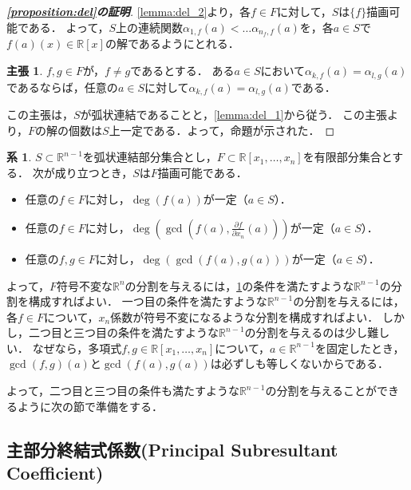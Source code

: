 \documentclass[uplatex, dvipdfmx]{jsarticle}
\newcommand{\R}{\mathbb{R}}
\theoremstyle{definition}
\newtheorem{corollary}{系}[section]
\newtheorem*{claim*}{主張}
\begin{document}
\begin{proof}[{\bf \cref{proposition:del}の証明}]
\cref{lemma:del_2}より，各$f \in F$に対して，$S$は$\{f\}$描画可能である．
よって，$S$上の連続関数$\alpha_{1,f}(a) < \dots \alpha_{n_f, f}(a)$を，各$a \in S$で$f(a)(x) \in \R[x]$の解であるようにとれる．

\begin{claim*}
$f, g \in F$が，$f \neq g$であるとする．
ある$a \in S$において$\alpha_{k,f}(a) = \alpha_{l,g}(a)$であるならば，任意の$a \in S$に対して$\alpha_{k,f}(a) = \alpha_{l,g}(a)$である．
\end{claim*}

この主張は，$S$が弧状連結であることと，\cref{lemma:del_1}から従う．
この主張より，$F$の解の個数は$S$上一定である．よって，命題が示された．
\end{proof}

\begin{corollary}\label{corollary:del}
$S \subset \R^{n-1}$を弧状連結部分集合とし，$F \subset \R[x_1,\dots, x_n]$を有限部分集合とする．
次が成り立つとき，$S$は$F$描画可能である．
\begin{itemize}
\item 任意の$f \in F$に対し，$\deg(f(a))$が一定（$a \in S$）．
\item 任意の$f \in F$に対し，$\deg(\gcd(f(a), \frac{\partial f}{\partial x_n}(a)))$が一定（$a \in S$）．
\item 任意の$f, g \in F$に対し，$\deg(\gcd(f(a), g(a)))$が一定（$a \in S$）．
\end{itemize}
\end{corollary}

よって，$F$符号不変な$\R^n$の分割を与えるには，\cref{corollary:del}の条件を満たすような$\R^{n-1}$の分割を構成すればよい．
一つ目の条件を満たすような$\R^{n-1}$の分割を与えるには，各$f \in F$について，$x_n$係数が符号不変になるような分割を構成すればよい．
しかし，二つ目と三つ目の条件を満たすような$\R^{n-1}$の分割を与えるのは少し難しい．
なぜなら，多項式$f, g \in \R[x_1, \dots, x_n]$について，$a \in \R^{n-1}$を固定したとき，$\gcd(f,g)(a)$と$\gcd(f(a),g(a))$は必ずしも等しくないからである．

よって，二つ目と三つ目の条件も満たすような$\R^{n-1}$の分割を与えることができるように次の節で準備をする．



\subsection{主部分終結式係数(Principal Subresultant Coefficient)}
\end{document}
